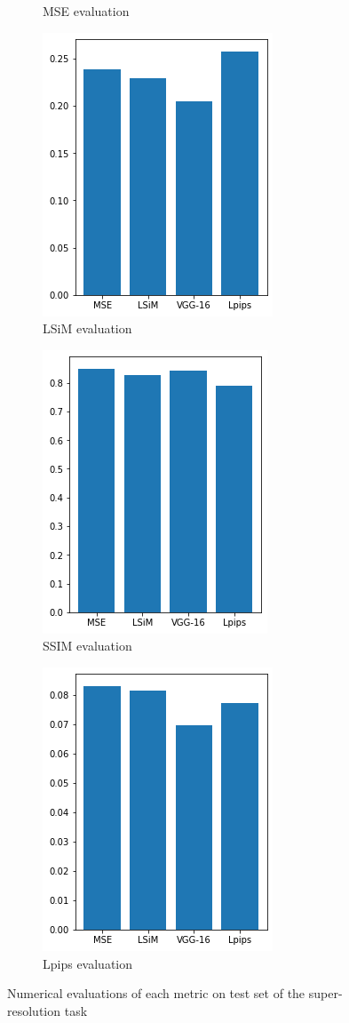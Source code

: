 \documentclass[a4paper,12pt,twoside]{report}
\begin{document}
\begin{figure}
\begin{subfigure}{0.32\textwidth}
		\caption{MSE evaluation}
	\end{subfigure}
	\begin{subfigure}{0.32\textwidth}
		\centering
		\includegraphics[scale=0.5]{superresolution/lsim.png}
		\caption{LSiM evaluation}
	\end{subfigure}
	\begin{subfigure}{0.32\textwidth}
		\centering
		\includegraphics[scale=0.5]{superresolution/ssim.png}
		\caption{SSIM evaluation}
	\end{subfigure}
	\begin{subfigure}{0.32\textwidth}
		\centering
		\includegraphics[scale=0.5]{superresolution/lpips.png}
		\caption{Lpips evaluation}
	\end{subfigure}
	\caption{Numerical evaluations of each metric on test set of the super-resolution task}
	\label{super numeval}
\end{figure}
\end{document}
